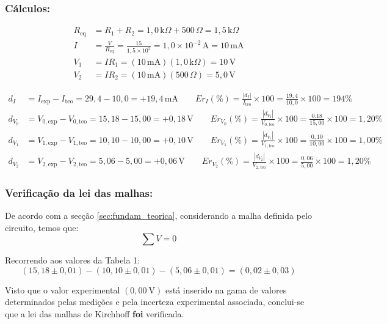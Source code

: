 \subsubsection{Cálculos:}

\[
\begin{aligned}
R_{\mathrm{eq}}&=R_1+R_2=1,0\,\mathrm{k}\Omega+500\,\Omega=1,5\,\mathrm{k}\Omega \\
I&=\frac{V}{R_{\mathrm{eq}}}=\frac{15}{1,5\times10^{3}}=1,0\times10^{-2}\,\mathrm{A}=10\,\mathrm{mA} \\
V_1&=IR_1=(10\,\mathrm{mA})(1,0\,\mathrm{k}\Omega)=10\,\mathrm{V} \\
V_2&=IR_2=(10\,\mathrm{mA})(500\,\Omega)=5,0\,\mathrm{V}
\end{aligned}
\]

\[
\begin{aligned}
d_I&=I_{\mathrm{exp}}-I_{\mathrm{teo}}
=29,4-10,0=+19,4\,\mathrm{mA}
\qquad
Er_I(\%)=\frac{|d_I|}{I_{\mathrm{teo}}}\times100
=\frac{19,4}{10,0}\times100=194\% \\[6pt]
d_{V_0}&=V_{0,\mathrm{exp}}-V_{0,\mathrm{teo}}
=15,18-15,00=+0,18\,\mathrm{V}
\qquad
Er_{V_0}(\%)=\frac{|d_{V_0}|}{V_{0,\mathrm{teo}}}\times100
=\frac{0.18}{15,00}\times100=1,20\% \\[6pt]
d_{V_1}&=V_{1,\mathrm{exp}}-V_{1,\mathrm{teo}}
=10,10-10,00=+0,10\,\mathrm{V}
\qquad
Er_{V_1}(\%)=\frac{|d_{V_1}|}{V_{1,\mathrm{teo}}}\times100
=\frac{0,10}{10,00}\times100=1,00\% \\[6pt]
d_{V_2}&=V_{2,\mathrm{exp}}-V_{2,\mathrm{teo}}
=5,06-5,00=+0,06\,\mathrm{V}
\qquad
Er_{V_2}(\%)=\frac{|d_{V_2}|}{V_{2,\mathrm{teo}}}\times100
=\frac{0,06}{5,00}\times100=1,20\%
\end{aligned}
\]



\subsubsection{Verificação da lei das malhas:}
De acordo com a secção \ref{sec:fundam_teorica}, considerando a malha definida pelo circuito, temos que:
\begin{equation*}
	\sum V = 0
\end{equation*}

Recorrendo aos valores da Tabela 1:
\begin{equation*}
	(15,18\pm0,01) - (10,10\pm0,01) - (5,06\pm0,01) = (0,02\pm0,03)
\end{equation*}

Visto que o valor experimental $(0,00\ \text{V})$ está inserido na gama de valores determinados pelas medições e pela incerteza experimental associada, conclui-se que a lei das malhas de Kirchhoff \textbf{foi} verificada.

